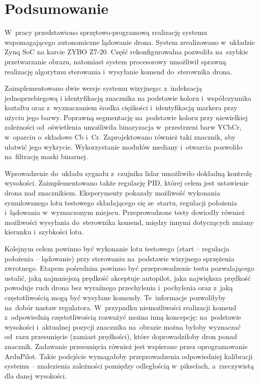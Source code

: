\chapter{Podsumowanie}
\label{cha:Podsumowanie i kierunki dalszych prac}

W~pracy przedstawiono sprzętowo-programową realizację systemu wspomagającego autonomiczne lądowanie drona.
System zrealizowano w~układzie Zynq SoC na karcie ZYBO Z7-20. 
Część rekonfigurowalna pozwoliła na~szybkie przetwarzanie obrazu, natomiast system procesorowy umożliwił sprawną realizację algorytmu sterowania i~wysyłanie komend do~sterownika drona. 

Zaimplementowano dwie wersje systemu wizyjnego: z~indeksacją jednoprzebiegową i identyfikacją znacznika na podstawie koloru i~współczynnika kształtu oraz z~wyznaczaniem środka ciężkości i~identyfikacją markera przy użyciu jego barwy. 
Poprawną segmentację na~podstawie koloru przy niewielkiej zależności od~oświetlenia umożliwiła binaryzacja w~przestrzeni barw YCbCr, w~oparciu o~składowe Cb i~Cr. 
Zaprojektowano również taki znacznik, aby ułatwić jego wykrycie. 
Wykorzystanie modułów mediany i~otwarcia pozwoliło na~filtrację maski binarnej.

Wprowadzenie do~układu sygnału z~czujnika lidar umożliwiło dokładną kontrolę wysokości.
Zaimplementowano także regulację PID, której celem jest ustawienie drona nad znacznikiem. 
Eksperymenty pokazały możliwość wykonania symulowanego lotu testowego składającego się ze~startu, regulacji położenia i~lądowania w~wyznaczonym miejscu.
Przeprowadzone testy dowiodły również możliwości wysyłania do~sterownika komend, między innymi dotyczących zmiany kierunku i~szybkości lotu. 

Kolejnym celem powinno być wykonanie lotu testowego (start -- regulacja położenia -- lądowanie) przy sterowaniu na~podstawie wizyjnego sprzężenia zwrotnego. 
Etapem pośrednim powinno być przeprowadzenie testu pozwalającego ustalić, jaką najmniejszą prędkość akceptuje autopilot, jaka największa prędkość powoduje ruch drona bez wyraźnego przechylenia i~pochylenia oraz z~jaką częstotliwością mogą być wysyłane komendy. 
Te~informacje pozwoliłyby na~dobór nastaw regulatora. 
W~przypadku niemożliwości realizacji komend z~odpowiednią częstotliwością rozważyć można inną koncepcję: na~podstawie wysokości i~aktualnej pozycji znacznika na~obrazie można byłoby wyznaczać od~razu przesunięcie (zamiast prędkości), które doprowadziłoby dron ponad znacznik. 
Zadawanie przesunięcia również jest wspierane przez oprogramowanie ArduPilot. 
Takie podejście wymagałoby przeprowadzenia odpowiedniej kalibracji systemu -- znalezienia zależności pomiędzy odległością w~pikselach, a~rzeczywistą dla danej wysokości.

